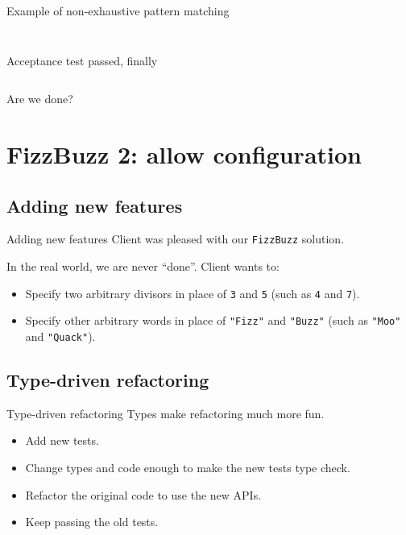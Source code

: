 \begin{frame}[fragile]{Example of non-exhaustive pattern matching}
  \inputminted[gobble=2]{scala}{FizzBuzz2Bad.scala}

  \inputminted{console}{testQuick4.console}
\end{frame}

\begin{frame}[fragile]{Acceptance test passed, finally}

  \inputminted{console}{testQuick5.console}

  Are we done?
\end{frame}

\section{FizzBuzz 2: allow configuration}

\subsection{Adding new features}

\begin{frame}{Adding new features}
  Client was pleased with our \texttt{FizzBuzz} solution.

  In the real world, we are never ``done''. Client wants to:
  \begin{itemize}
  \item Specify two \alert{arbitrary} divisors in place of \texttt{3} and \texttt{5} (such as \texttt{4} and \texttt{7}).
  \item Specify other \alert{arbitrary} words in place of \texttt{"Fizz"} and \texttt{"Buzz"} (such as \texttt{"Moo"} and \texttt{"Quack"}).
  \end{itemize}
\end{frame}

\subsection{Type-driven refactoring}

\begin{frame}{Type-driven refactoring}
  Types make refactoring much more fun.

  \begin{itemize}
  \item Add \alert{new} tests.
  \item Change types and code enough to make the new tests \alert{type check}.
  \item \alert{Refactor} the original code to use the new APIs.
  \item Keep passing the \alert{old} tests.
  \end{itemize}
\end{frame}

